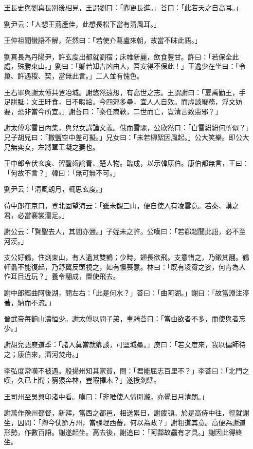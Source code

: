 王長史與劉真長別後相見，王謂劉曰：「卿更長進。」荅曰：「此若天之自高耳。」

劉尹云：「人想王荊產佳，此想長松下當有清風耳。」

王仲祖聞蠻語不解，茫然曰：「若使介葛盧來朝，故當不昧此語。」

劉真長為丹陽尹，許玄度出都就劉宿；床帷新麗，飲食豐甘。許曰：「若保全此處，殊勝東山。」劉曰：「卿若知吉凶由人，吾安得不保此！」王逸少在坐曰：「令巢、許遇稷、契，當無此言。」二人並有愧色。

王右軍與謝太傅共登冶城。謝悠然遠想，有高世之志。王謂謝曰：「夏禹勤王，手足胼胝；文王旰食，日不暇給。今四郊多壘，宜人人自效。而虛談廢務，浮文妨要，恐非當今所宜。」謝荅曰：「秦任商鞅，二世而亡，豈清言致患邪？」

謝太傅寒雪日內集，與兒女講論文義。俄而雪驟，公欣然曰：「白雪紛紛何所似？」兄子胡兒曰：「撒鹽空中差可擬。」兄女曰：「未若柳絮因風起。」公大笑樂。即公大兄無奕女，左將軍王凝之妻也。

王中郎令伏玄度、習鑿齒論青、楚人物。臨成，以示韓康伯。康伯都無言，王曰：「何故不言？」韓曰：「無可無不可。」

劉尹云：「清風朗月，輒思玄度。」

荀中郎在京口，登北固望海云：「雖未覩三山，便自使人有凌雲意。若秦、漢之君，必當褰裳濡足。」

謝公云：「賢聖去人，其間亦邇。」子姪未之許。公嘆曰：「若郗超聞此語，必不至河漢。」

支公好鶴，住剡東山，有人遺其雙鶴；少時，翅長欲飛。支意惜之，乃鎩其翮。鶴軒翥不能復起，乃舒翼反頭視之，如有懊喪意。林曰：「既有凌霄之姿，何肯為人作耳目近玩？」養令翮成，置使飛去。

謝中郎經曲阿後湖，問左右：「此是何水？」荅曰：「曲阿湖。」謝曰：「故當淵注渟著，納而不流。」

晉武帝每餉山濤恒少。謝太傅以問子弟，車騎荅曰：「當由欲者不多，而使與者忘少。」

謝胡兒語庾道季：「諸人莫當就卿談，可堅城壘。」庾曰：「若文度來，我以偏師待之；康伯來，濟河焚舟。」

李弘度常嘆不被遇。殷揚州知其家貧，問：「君能屈志百里不？」李荅曰：「北門之嘆，久已上聞；窮猿奔林，豈暇擇木？」遂授剡縣。

王司州至吳興印渚中看。嘆曰：「非唯使人情開滌，亦覺日月清朗。」

謝萬作豫州都督，新拜，當西之都邑，相送累日，謝疲頓。於是高侍中往，徑就謝坐，因問：「卿今仗節方州，當疆理西蕃，何以為政？」謝粗道其意。高便為謝道形勢，作數百語。謝遂起坐。高去後，謝追曰：「阿酃故麤有才具。」謝因此得終坐。


